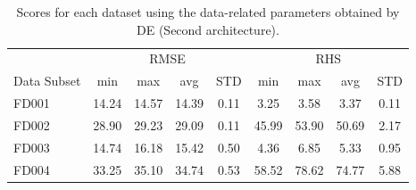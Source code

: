 \documentclass[preprint,12pt]{elsarticle}%
\begin{document}
\begin{table}
\begin{center}
\caption
{Scores for each dataset using the data-related parameters obtained by DE (Second architecture).}%
%

\begin{tabular}
[c]{l|cccc|cccc}\hline
& \multicolumn{4}{|c}{RMSE} & \multicolumn{4}{|c}{RHS}\\
Data Subset & min & max & avg & STD & min & max & avg & STD\\\hline\hline
FD001 & 14.24 & 14.57 & 14.39 & 0.11 & 3.25 & 3.58 & 3.37 & 0.11\\
FD002 & 28.90 & 29.23 & 29.09 & 0.11 & 45.99 & 53.90 & 50.69 & 2.17\\
FD003 & 14.74 & 16.18 & 15.42 & 0.50 & 4.36 & 6.85 & 5.33 & 0.95\\
FD004 & 33.25 & 35.10 & 34.74 & 0.53 & 58.52 & 78.62 & 74.77 & 5.88\\\hline
\end{tabular}
\label{table:results_ann_de}%

\end{center}
\end{table}%
%

%
\end{document}
